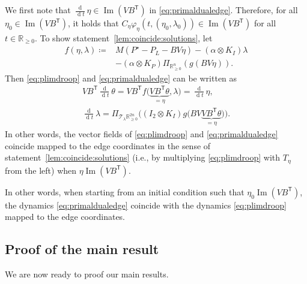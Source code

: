 \documentclass[twocolumn,twoside,journal]{IEEEtran}
\DeclareMathOperator{\diff}{d}
\DeclareMathOperator{\Ima}{Im}
\newcommand{\ddt}{\tfrac{\diff}{\diff \!t}}
\begin{document}
\begin{IEEEproof}
We first note that $\ddt \eta \in \Ima(VB^\mathsf{T})$ in \eqref{eq:primaldualedge}. Therefore, for all $\eta_0 \in \Ima(VB^\mathsf{T})$, it holds that $C_\eta \varphi_\eta(t,(\eta_0,\lambda_0)) \in \Ima(VB^\mathsf{T})$ for all $t \in \mathbb{R}_{\geq 0}$. To show statement~\ref{lem:coincide:solutions}, let 
\begin{align*}
    f(\eta, \lambda) \coloneqq& M\left(P^\star-P_L-B V \eta\right)- (\alpha \otimes K_I) \lambda    \\
    & -(\alpha \otimes K_P)\Pi_{\mathbb{R}_{\geq 0}^n}\left(g(BV\eta)\right).
\end{align*}
Then \eqref{eq:plimdroop} and \eqref{eq:primaldualedge} can be written as
\begin{align}\label{eq:sigma_eta}
        VB^\mathsf{T} \ddt \theta = VB^\mathsf{T} f \big(\underbrace{VB^\mathsf{T}\theta}_{=\eta}, \lambda\big) = 
        \ddt \eta, \\
        \ddt \lambda = \Pi_{\mathcal{T}_{\lambda} \mathbb{R}^{2n}_{\geq 0}}\bigg((I_2 \otimes K_I) g\big(BV\underbrace{VB^\mathsf{T}\theta}_{=\eta}\big)\bigg).
\end{align}
In other words, the vector fields of \eqref{eq:plimdroop} and \eqref{eq:primaldualedge} coincide mapped to the edge coordinates in the sense of statement~\ref{lem:coincide:solutions} (i.e., by multiplying \eqref{eq:plimdroop} with $T_\eta$ from the left) when $\eta \Ima(VB^\mathsf{T})$.
\end{IEEEproof}
In other words, when starting from an initial condition such that $\eta_0 \Ima(VB^\mathsf{T})$, the dynamics \eqref{eq:primaldualedge} coincide with the dynamics \eqref{eq:plimdroop} mapped to the edge coordinates. 


\subsection{Proof of the main result}
We are now ready to proof our main results.
\end{document}
